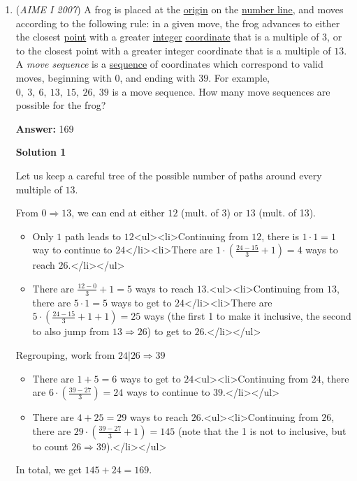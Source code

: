 \begin{enumerate}
	\item (\textit{AIME I 2007}) A frog is placed at the \href{https://artofproblemsolving.com/wiki/index.php?title=Origin}{origin} on the \href{https://artofproblemsolving.com/wiki/index.php?title=Number\_line}{number line}, and moves according to the following rule: in a given move, the frog advances to either the closest \href{https://artofproblemsolving.com/wiki/index.php?title=Point}{point} with a greater \href{https://artofproblemsolving.com/wiki/index.php?title=Integer}{integer} \href{https://artofproblemsolving.com/wiki/index.php?title=Coordinate}{coordinate} that is a multiple of $3$, or to the closest point with a greater integer coordinate that is a multiple of $13$. A \textit{move sequence} is a \href{https://artofproblemsolving.com/wiki/index.php?title=Sequence}{sequence} of coordinates which correspond to valid moves, beginning with $0$, and ending with $39$. For example, $0,\ 3,\ 6,\ 13,\ 15,\ 26,\ 39$ is a move sequence. How many move sequences are possible for the frog?


 
 \textbf{Answer: }169



\textbf{Solution 1}

Let us keep a careful tree of the possible number of paths around every multiple of $13$.

 From $0 \Rightarrow 13$, we can end at either $12$ (mult. of 3) or $13$ (mult. of 13). 

 
            \begin{itemize}
        \item Only $1$ path leads to $12$<ul><li>Continuing from $12$, there is $1 \cdot 1 = 1$ way to continue to $24$</li><li>There are $1 \cdot \left(\frac{24-15}{3} + 1\right) = 4$ ways to reach $26$.</li></ul>
        \item There are $\frac{12 - 0}{3} + 1 = 5$ ways to reach $13$.<ul><li>Continuing from $13$, there are $5 \cdot 1 = 5$ ways to get to $24$</li><li>There are $5 \cdot \left(\frac{24-15}{3} + 1 + 1\right) = 25$ ways (the first 1 to make it inclusive, the second to also jump from $13 \Rightarrow 26$) to get to $26$.</li></ul>
            \end{itemize}
            Regrouping, work from $24 | 26\Rightarrow 39$

            \begin{itemize}
        \item There are $1 + 5 = 6$ ways to get to $24$<ul><li>Continuing from $24$, there are $6 \cdot \left(\frac{39 - 27}{3}\right) = 24$ ways to continue to $39$.</li></ul>
        \item There are $4 + 25 = 29$ ways to reach $26$.<ul><li>Continuing from $26$, there are $29 \cdot \left(\frac{39-27}{3} + 1\right) = 145$ (note that the 1 is not to inclusive, but to count $26 \Rightarrow 39$).</li></ul>
            \end{itemize}
            In total, we get $145 + 24 = 169$.


\end{enumerate}
